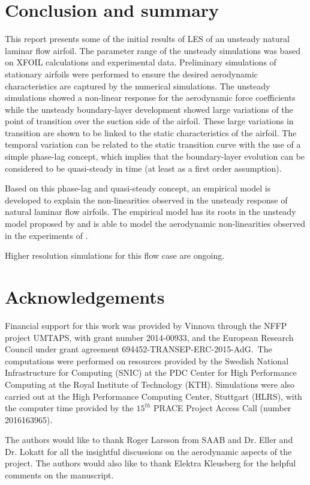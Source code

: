 \section{Conclusion and summary}
This report presents some of the initial results of LES of an unsteady natural laminar flow airfoil. The parameter range of the unsteady simulations was based on XFOIL calculations and experimental data. Preliminary simulations of stationary airfoils were performed to ensure the desired aerodynamic characteristics are captured by the numerical simulations. The unsteady simulations showed a non-linear response for the aerodynamic force coefficients while the unsteady boundary-layer development showed large variations of the point of transition over the suction side of the airfoil. These large variations in transition are shown to be linked to the static characteristics of the airfoil. The temporal variation can be related to the static transition curve with the use of a simple phase-lag concept, which implies that the boundary-layer evolution can be considered to be quasi-steady in time (at least as a first order assumption).

Based on this phase-lag and quasi-steady concept, an empirical model is developed to explain the non-linearities observed in the unsteady response of natural laminar flow airfoils. The empirical model has its roots in the unsteady model proposed by \cite{theodorsen35} and is able to model the aerodynamic non-linearities observed in the experiments of \cite{lokattthesis}.

Higher resolution simulations for this flow case are ongoing.


\section*{Acknowledgements}
Financial support for this work was provided by Vinnova through the NFFP project UMTAPS, with grant number 2014-00933, and the European Research Council under grant agreement 694452-TRANSEP-ERC-2015-AdG.\ The computations were performed on resources provided by the Swedish National Infrastructure for Computing (SNIC) at the PDC Center for High Performance Computing at the Royal Institute of Technology (KTH). Simulations were also carried out at the High Performance Computing Center, Stuttgart (HLRS), with the computer time provided by the $15^{th}$ PRACE Project Access Call (number 2016163965).

The authors would like to thank Roger Larsson from SAAB and Dr. Eller and Dr. Lokatt for all the insightful discussions on the aerodynamic aspects of the project. The authors would also like to thank Elektra Kleusberg for the helpful comments on the manuscript. 

%
%
%
